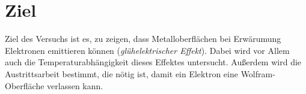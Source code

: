 \section{Ziel}
\label{sec:Ziel}


Ziel des Versuchs ist es, zu zeigen, dass Metalloberflächen bei Erwärumung Elektronen emittieren können (\textit{glühelektrischer Effekt}). Dabei
wird vor Allem auch die Temperaturabhängigkeit dieses Effektes untersucht. Außerdem wird die Austrittsarbeit bestimmt, die nötig ist, damit ein Elektron eine Wolfram-Oberfläche verlassen kann.